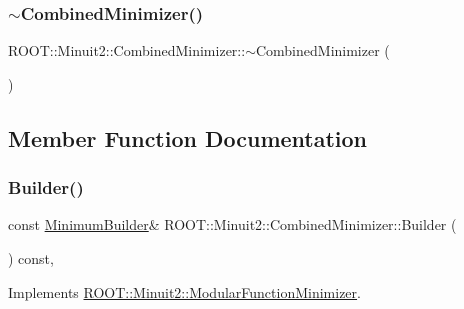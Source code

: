 \mbox{\label{classROOT_1_1Minuit2_1_1CombinedMinimizer_a09de1afbff4418ffaf7b94e625243cd1}} 
\subsubsection{\texorpdfstring{$\sim$CombinedMinimizer()}{~CombinedMinimizer()}\hspace{0.1cm}{\footnotesize\ttfamily [2/2]}}
{\footnotesize\ttfamily R\+O\+O\+T\+::\+Minuit2\+::\+Combined\+Minimizer\+::$\sim$\+Combined\+Minimizer (\begin{DoxyParamCaption}{ }\end{DoxyParamCaption})\hspace{0.3cm}{\ttfamily [inline]}}



\subsection{Member Function Documentation}
\mbox{\label{classROOT_1_1Minuit2_1_1CombinedMinimizer_a73befc9c0bdfe8c9f09638505772c5ed}} 
\subsubsection{\texorpdfstring{Builder()}{Builder()}\hspace{0.1cm}{\footnotesize\ttfamily [1/2]}}
{\footnotesize\ttfamily const \mbox{\hyperlink{classROOT_1_1Minuit2_1_1MinimumBuilder}{Minimum\+Builder}}\& R\+O\+O\+T\+::\+Minuit2\+::\+Combined\+Minimizer\+::\+Builder (\begin{DoxyParamCaption}{ }\end{DoxyParamCaption}) const\hspace{0.3cm}{\ttfamily [inline]}, {\ttfamily [virtual]}}



Implements \mbox{\hyperlink{classROOT_1_1Minuit2_1_1ModularFunctionMinimizer_a13e98551cf14e927c61e1e34ecf8ba8b}{R\+O\+O\+T\+::\+Minuit2\+::\+Modular\+Function\+Minimizer}}.

